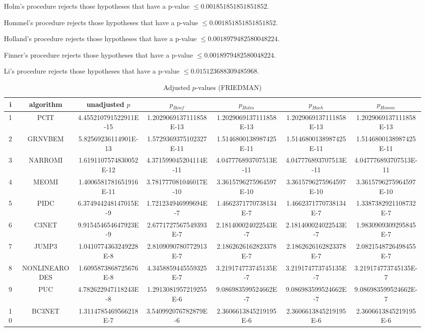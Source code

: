 \documentclass[a4paper,10pt]{article}
\begin{document}
\begin{landscape}
Holm's procedure rejects those hypotheses that have a p-value $\le0.001851851851851852$.


Hommel's procedure rejects those hypotheses that have a p-value $\le0.001851851851851852$.


Holland's procedure rejects those hypotheses that have a p-value $\le0.0018979482580048224$.


Finner's procedure rejects those hypotheses that have a p-value $\le0.0018979482580048224$.


Li's procedure rejects those hypotheses that have a p-value $\le0.015123688309485968$.



\newpage

\begin{table}[!htp]
\centering\scriptsize
\caption{Adjusted $p$-values (FRIEDMAN)}
\begin{tabular}{ccccccc}
i&algorithm&unadjusted $p$&$p_{Bonf}$&$p_{Holm}$&$p_{Hoch}$&$p_{Homm}$\\
\hline
1&PCIT&4.455210791522911E-15&1.2029069137111858E-13&1.2029069137111858E-13&1.2029069137111858E-13&1.2029069137111858E-13\\
2&GRNVBEM&5.82569236114901E-13&1.5729369375102327E-11&1.5146800138987425E-11&1.5146800138987425E-11&1.5146800138987425E-11\\
3&NARROMI&1.6191107574830052E-12&4.371599045204114E-11&4.047776893707513E-11&4.047776893707513E-11&4.047776893707513E-11\\
4&MEOMI&1.4006581781651916E-11&3.781777081046017E-10&3.3615796275964597E-10&3.3615796275964597E-10&3.3615796275964597E-10\\
5&PIDC&6.374944248147015E-9&1.721234946999694E-7&1.4662371770738134E-7&1.4662371770738134E-7&1.3387382921108732E-7\\
6&C3NET&9.915454654647923E-9&2.6771727567549393E-7&2.181400024022543E-7&2.181400024022543E-7&1.9830909309295845E-7\\
7&JUMP3&1.0410774363249228E-8&2.8109090780772913E-7&2.1862626162823378E-7&2.1862626162823378E-7&2.0821548726498455E-7\\
8&NONLINEARODES&1.6095873868725676E-8&4.3458859445559325E-7&3.219174773745135E-7&3.219174773745135E-7&3.219174773745135E-7\\
9&PUC&4.782622947118243E-8&1.2913081957219255E-6&9.086983599524662E-7&9.086983599524662E-7&9.086983599524662E-7\\
10&BC3NET&1.3114785469566218E-7&3.540992076782879E-6&2.3606613845219195E-6&2.3606613845219195E-6&2.3606613845219195E-6\\

\end{tabular}
\end{table}
\end{landscape}
\end{document}
